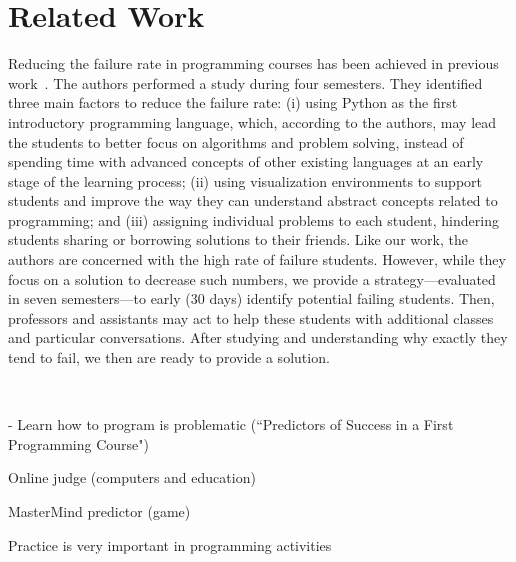 \section{Related Work}

Reducing the failure rate in programming courses has been achieved in previous work~\cite{}. The authors performed a study during four semesters. They identified three main factors to reduce the failure rate: (i) using Python as the first introductory programming language, which, according to the authors, may lead the students to better focus on algorithms and problem solving, instead of spending time with advanced concepts of other existing languages at an early stage of the learning process; (ii) using visualization environments to support students and improve the way they can understand abstract concepts related to programming; and (iii) assigning individual problems to each student, hindering students sharing or borrowing solutions to their friends. Like our work, the authors are concerned with the high rate of failure students. However, while they focus on a solution to decrease such numbers, we provide a strategy---evaluated in seven semesters---to early (30 days) identify potential failing students. Then, professors and assistants may act to help these students with additional classes and particular conversations. After studying and understanding why exactly they tend to fail, we then are ready to provide a solution.  

~\cite{camel-2006}

- Learn how to program is problematic (``Predictors of Success in a First Programming Course")~\cite{simon-predictors-ace2006}

Online judge (computers and education)~\cite{cheang-online-judge-2003}

MasterMind predictor (game)~\cite{lorenzenC06-mastermind-predictor-sigcse2008}

Practice is very important in programming activities~\cite{on-automated-grading}